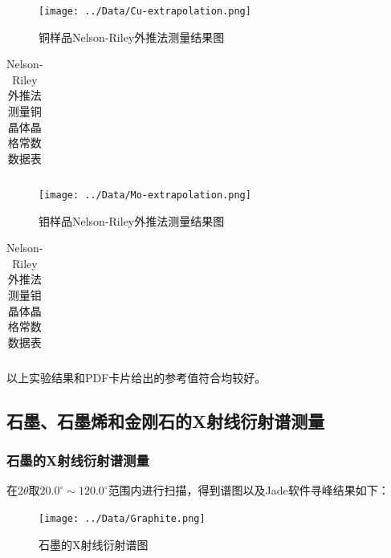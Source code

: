 \documentclass{thuemp}
\begin{document}
\begin{figure}[H]
    \centering
    \texttt{[image: ../Data/Cu-extrapolation.png]}
    \caption{铜样品Nelson-Riley外推法测量结果图}
    \label{fig:cu_xrd_extrapol}
\end{figure}

\begin{table}[H]
    \centering
    \captionnamefont{\wuhao\bf\heiti}
    \captiontitlefont{\wuhao\bf\heiti}
    \caption{Nelson-Riley外推法测量铜晶体晶格常数数据表}
    \label{tab:cu_xrd_extrapol}
    \liuhao
    \begin{tabular}{ccccc}
        \toprule
        \midrule
        \bottomrule
    \end{tabular}
\end{table}

\begin{figure}[H]
    \centering
    \texttt{[image: ../Data/Mo-extrapolation.png]}
    \caption{钼样品Nelson-Riley外推法测量结果图}
    \label{fig:mo_xrd_extrapol}
\end{figure}

\begin{table}[H]
    \centering
    \captionnamefont{\wuhao\bf\heiti}
    \captiontitlefont{\wuhao\bf\heiti}
    \caption{Nelson-Riley外推法测量钼晶体晶格常数数据表}
    \label{tab:mo_xrd_extrapol}
    \liuhao
    \begin{tabular}{ccccc}
        \toprule
        \midrule
        \bottomrule
    \end{tabular}
\end{table}

以上实验结果和PDF卡片给出的参考值符合均较好。

\subsection{石墨、石墨烯和金刚石的X射线衍射谱测量}

\subsubsection{石墨的X射线衍射谱测量}

在$2\theta$取$20.0^\circ \sim 120.0^\circ$范围内进行扫描，得到谱图以及Jade软件寻峰结果如下：

\begin{figure}[H]
    \centering
    \texttt{[image: ../Data/Graphite.png]}
    \caption{石墨的X射线衍射谱图}
    \label{fig:graphite_xrd}
\end{figure}
\end{document}
